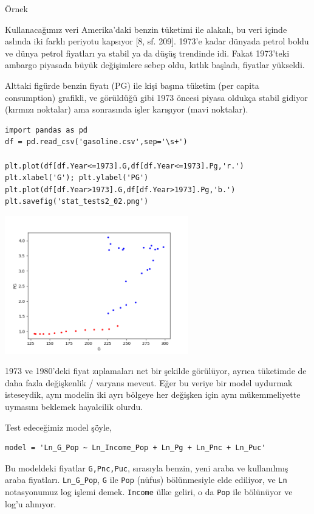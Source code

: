 \documentclass[12pt,fleqn]{article}\usepackage{../../common}
\begin{document}
Örnek

Kullanacağımız veri Amerika'daki benzin tüketimi ile alakalı, bu veri
içinde aslında iki farklı periyotu kapsıyor [8, sf. 209]. 1973'e kadar
dünyada petrol boldu ve dünya petrol fiyatları ya stabil ya da düşüş
trendinde idi. Fakat 1973'teki ambargo piyasada büyük değişimlere sebep
oldu, kıtlık başladı, fiyatlar yükseldi. 

Alttaki figürde benzin fiyatı (PG) ile kişi başına tüketim (per capita
consumption) grafikli, ve görüldüğü gibi 1973 öncesi piyasa oldukça stabil
gidiyor (kırmızı noktalar) ama sonrasında işler karışıyor (mavi noktalar).

\begin{verbatim}
import pandas as pd
df = pd.read_csv('gasoline.csv',sep='\s+')

plt.plot(df[df.Year<=1973].G,df[df.Year<=1973].Pg,'r.')
plt.xlabel('G'); plt.ylabel('PG')
plt.plot(df[df.Year>1973].G,df[df.Year>1973].Pg,'b.')
plt.savefig('stat_tests2_02.png')
\end{verbatim}

\includegraphics[height=6cm]{stat_tests2_02.png}

1973 ve 1980'deki fiyat zıplamaları net bir şekilde görülüyor, ayrıca
tüketimde de daha fazla değişkenlik / varyans mevcut. Eğer bu veriye bir
model uydurmak isteseydik, aynı modelin iki ayrı bölgeye her değişken için
aynı mükemmeliyette uymasını beklemek hayalcilik olurdu.

Test edeceğimiz model şöyle, 

\begin{verbatim}
model = 'Ln_G_Pop ~ Ln_Income_Pop + Ln_Pg + Ln_Pnc + Ln_Puc'
\end{verbatim}

Bu modeldeki fiyatlar \verb!G,Pnc,Puc!, sırasıyla benzin, yeni araba ve
kullanılmış araba fiyatları. \verb!Ln_G_Pop!, \verb!G! ile \verb!Pop!
(nüfus) bölünmesiyle elde ediliyor, ve \verb!Ln! notasyonumuz log işlemi
demek. \verb!Income! ülke geliri, o da \verb!Pop! ile bölünüyor ve log'u
alınıyor.
\end{document}
